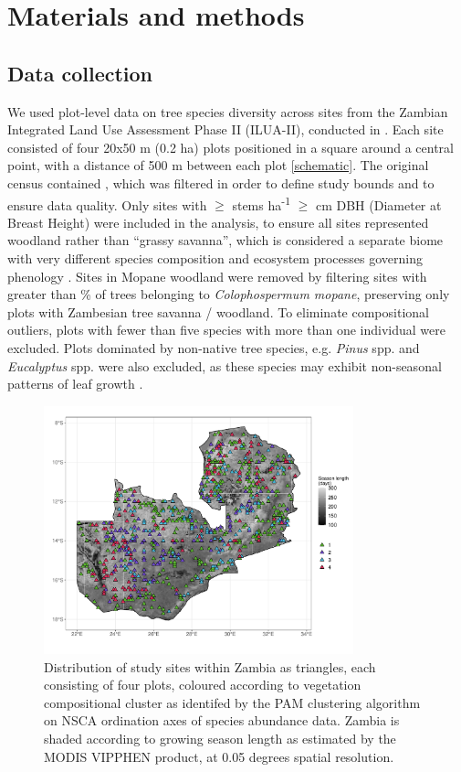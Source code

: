 \documentclass[11pt,a4paper]{article}
\begin{document}
\section{Materials and methods}

\subsection{Data collection}

We used plot-level data on tree species diversity across \nSites{} sites from the Zambian Integrated Land Use Assessment Phase II (ILUA-II), conducted in \censusDate{} \citep{}. Each site consisted of four 20x50 m (0.2 ha) plots positioned in a square around a central point, with a distance of 500 m between each plot \autoref{schematic}. The original census contained \nTotalSites{}, which was filtered in order to define study bounds and to ensure data quality. Only sites with $\geq$\stemsHa{} stems ha\textsuperscript{-1} $\geq$\stemSize{} cm DBH (Diameter at Breast Height) were included in the analysis, to ensure all sites represented woodland rather than “grassy savanna”, which is considered a separate biome with very different species composition and ecosystem processes governing phenology \citep{Parr2014}. Sites in Mopane woodland were removed by filtering sites with greater than \mopanePer{}\% of trees belonging to \textit{Colophospermum mopane}, preserving only plots with Zambesian tree savanna / woodland. To eliminate compositional outliers, plots with fewer than five species with more than one individual were excluded. Plots dominated by non-native tree species, e.g. \textit{Pinus} spp. and \textit{Eucalyptus} spp. were also excluded, as these species may exhibit non-seasonal patterns of leaf growth \citep{}.

\begin{figure}[H]
\centering
	\includegraphics[width=0.8\textwidth]{plot_loc}
	\caption{Distribution of study sites within Zambia as triangles, each consisting of four plots, coloured according to vegetation compositional cluster as identifed by the PAM clustering algorithm on NSCA ordination axes of species abundance data. Zambia is shaded according to growing season length as estimated by the MODIS VIPPHEN product, at 0.05 degrees spatial resolution.}
	\label{plot_loc}
\end{figure}
\end{document}
